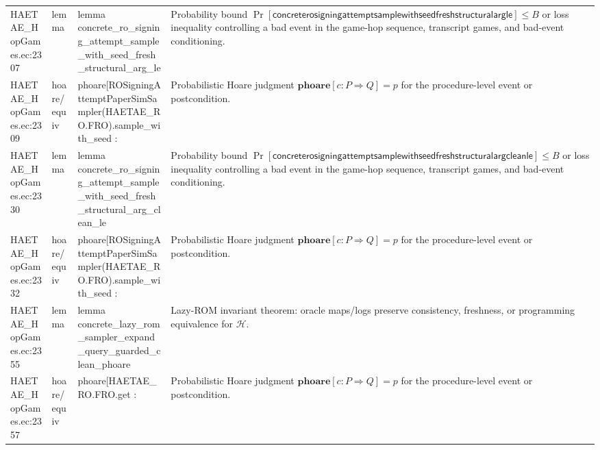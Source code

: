 \documentclass[10pt]{article}
\begin{document}
\begin{longtable}{L{0.11\textwidth}L{0.055\textwidth}L{0.385\textwidth}L{0.41\textwidth}}
HAETAE\_\allowbreak{}HopGames.\allowbreak{}ec:\allowbreak{}2307 & lemma & {\ttfamily\scriptsize lemma concrete\_\allowbreak{}ro\_\allowbreak{}signing\_\allowbreak{}attempt\_\allowbreak{}sample\_\allowbreak{}with\_\allowbreak{}seed\_\allowbreak{}fresh\_\allowbreak{}structural\_\allowbreak{}arg\_\allowbreak{}le} & Probability bound $\Pr[\mathsf{concreterosigningattemptsamplewithseedfreshstructuralargle}]\le B$ or loss inequality controlling a bad event in the game-hop sequence, transcript games, and bad-event conditioning. \\
HAETAE\_\allowbreak{}HopGames.\allowbreak{}ec:\allowbreak{}2309 & hoare/equiv & {\ttfamily\scriptsize phoare[ROSigningAttemptPaperSimSampler(HAETAE\_\allowbreak{}RO.FRO).sample\_\allowbreak{}with\_\allowbreak{}seed :} & Probabilistic Hoare judgment $\mathbf{phoare}[c:P\Rightarrow Q]=p$ for the procedure-level event or postcondition. \\
HAETAE\_\allowbreak{}HopGames.\allowbreak{}ec:\allowbreak{}2330 & lemma & {\ttfamily\scriptsize lemma concrete\_\allowbreak{}ro\_\allowbreak{}signing\_\allowbreak{}attempt\_\allowbreak{}sample\_\allowbreak{}with\_\allowbreak{}seed\_\allowbreak{}fresh\_\allowbreak{}structural\_\allowbreak{}arg\_\allowbreak{}clean\_\allowbreak{}le} & Probability bound $\Pr[\mathsf{concreterosigningattemptsamplewithseedfreshstructuralargcleanle}]\le B$ or loss inequality controlling a bad event in the game-hop sequence, transcript games, and bad-event conditioning. \\
HAETAE\_\allowbreak{}HopGames.\allowbreak{}ec:\allowbreak{}2332 & hoare/equiv & {\ttfamily\scriptsize phoare[ROSigningAttemptPaperSimSampler(HAETAE\_\allowbreak{}RO.FRO).sample\_\allowbreak{}with\_\allowbreak{}seed :} & Probabilistic Hoare judgment $\mathbf{phoare}[c:P\Rightarrow Q]=p$ for the procedure-level event or postcondition. \\
HAETAE\_\allowbreak{}HopGames.\allowbreak{}ec:\allowbreak{}2355 & lemma & {\ttfamily\scriptsize lemma concrete\_\allowbreak{}lazy\_\allowbreak{}rom\_\allowbreak{}sampler\_\allowbreak{}expand\_\allowbreak{}query\_\allowbreak{}guarded\_\allowbreak{}clean\_\allowbreak{}phoare} & Lazy-ROM invariant theorem: oracle maps/logs preserve consistency, freshness, or programming equivalence for $\mathcal H$. \\
HAETAE\_\allowbreak{}HopGames.\allowbreak{}ec:\allowbreak{}2357 & hoare/equiv & {\ttfamily\scriptsize phoare[HAETAE\_\allowbreak{}RO.FRO.get :} & Probabilistic Hoare judgment $\mathbf{phoare}[c:P\Rightarrow Q]=p$ for the procedure-level event or postcondition. \\

\end{longtable}
\end{document}
